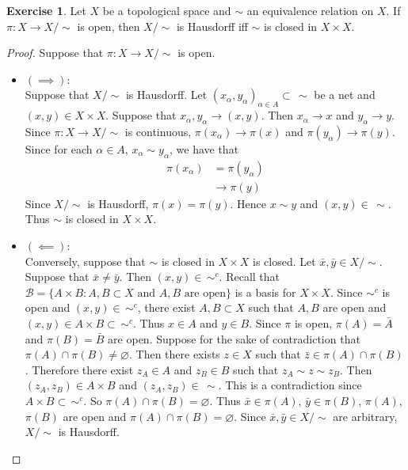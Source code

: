 \documentclass[12pt]{amsart}
\theoremstyle{definition}
\newtheorem{ex}[definition]{Exercise}
\newcommand{\al}{\alpha}
\newcommand{\MB}{\mathcal{B}}
\begin{document}
	\begin{ex}
		Let $X$ be a topological space and $\sim$ an equivalence relation on $X$. If $\pi: X \rightarrow X / \sim$ is open, then $X / \sim$ is Hausdorff iff $\sim$ is closed in $X \times X$.
	\end{ex}
	
	\begin{proof}
		Suppose that $\pi:X \rightarrow X / \sim$ is open. 
		\begin{itemize}
			\item $(\implies)$: \\
			Suppose that $X/\sim$ is Hausdorff. Let $(x_{\al}, y_{\al})_{\al \in A} \subset \, \sim$ be a net and $(x,y) \in X \times X$. Suppose that $x_{\al}, y_{\al} \rightarrow (x,y)$. Then $x_{\al} \rightarrow x$ and $y_{\al} \rightarrow y$. Since $\pi:X \rightarrow X / \sim$ is continuous, $\pi(x_{\al}) \rightarrow \pi(x)$ and $\pi(y_{\al}) \rightarrow \pi(y)$. Since for each $\al \in A$, $x_{\al} \sim y_{\al}$, we have that 
			\begin{align*}
				\pi(x_{\al}) 
				& = \pi(y_{\al})\\
				& \rightarrow \pi(y)
			\end{align*}
			Since $X/ \sim$ is Hausdorff, $\pi(x) = \pi(y)$. Hence $x \sim y$ and $(x,y) \in \, \sim$. Thus $\sim$ is closed in $X \times X$.\\
			\item $(\impliedby)$: \\
			Conversely, suppose that $\sim$ is closed in $X \times X$ is closed. Let $\bar{x}, \bar{y} \in X / \sim$. Suppose that $\bar{x} \neq \bar{y}$. Then $(x,y) \in \, \sim^c$. Recall that $\MB =\{A \times B: A,B \subset X \text{ and $A, B$ are open} \}$ is a basis for $X \times X$. Since  $\sim^c$ is open and $(x,y) \in \, \sim^c$, there exist $A,B \subset X$ such that $A,B$ are open and $(x,y) \in A \times B \subset \, \sim^c$. Thus $x \in A$ and $y \in B$. Since $\pi$ is open, $\pi(A) = \bar{A}$ and $\pi(B) = \bar{B}$ are open. Suppose for the sake of contradiction that $\pi(A) \cap \pi(B) \neq \varnothing$. Then there exists $z \in X$ such that $\bar{z} \in \pi(A) \cap \pi(B)$. Therefore there exist $z_A \in A$ and $z_B \in B$ such that $z_A \sim z \sim z_B$. Then $(z_A, z_B) \in A \times B$ and $(z_A, z_B) \in \, \sim$. This is a contradiction since $A \times B \subset \, \sim^c$. So $\pi(A) \cap \pi(B) = \varnothing$. Thus $\bar{x} \in \pi(A)$, $\bar{y} \in \pi(B)$, $\pi(A)$, $\pi(B)$ are open and $\pi(A) \cap \pi(B) = \varnothing$. Since $\bar{x}, \bar{y} \in X / \sim$ are arbitrary, $X / \sim$ is Hausdorff.
		\end{itemize}
	\end{proof}
	
\end{document}
